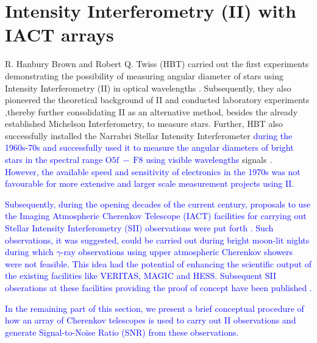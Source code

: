 \section{Intensity Interferometry (II) with IACT arrays}
R. Hanbury Brown and Robert Q. Twiss (HBT) carried out the first experiments demonstrating the possibility of measuring angular diameter of stars using Intensity Interferometry (II) in optical wavelengths \citep{HBT56}. Subsequently, they also pioneered the theoretical background of II and conducted laboratory experiments \citep{brown1957interferometry,brown1958interferometry},thereby further consolidating II as an alternative method, besides the already established Michelson Interferometry, to measure stars. Further, HBT also successfully installed the Narrabri Stellar Intensity Interferometer \textcolor{blue}{during the 1960s-70s and successfully used it to measure the angular diameters of bright stars in the spectral range $\mathrm{O5f}\ -\ \mathrm{F8}$ using visible wavelengths} signals \citep{brown1974intensity}. \\\textcolor{blue}
{However, the available speed and sensitivity of electronics in the 1970s was not favourable for more extensive and larger scale measurement projects using II.}

\textcolor{blue}{Subsequently, during the opening decades of the current century, proposals to use the Imaging Atmospheric Cherenkov Telescope (IACT) facilities for carrying out Stellar Intensity Interferometry (SII) observations were put forth \citep{LeBohec2006, nunez2010stellar, nunez2012high, Dravins2013}. Such observations, it was suggested, could be carried out during bright moon-lit nights during which $\gamma$-ray observations using upper atmospheric Cherenkov showers were not feasible. This idea had the potential of enhancing the scientific output of the existing facilities like VERITAS, MAGIC and HESS. Subsequent SII obserations at these facilities providing the proof of concept have been published \citep{abeysekara2020demonstration, Abe2024MAGIC, Zmija2023}. }

\textcolor{blue}{In the remaining part of this section, we present a brief conceptual procedure of how an array of Cherenkov telescopes is used to carry out II observations and generate Signal-to-Noise Ratio (SNR) from these observations.}

